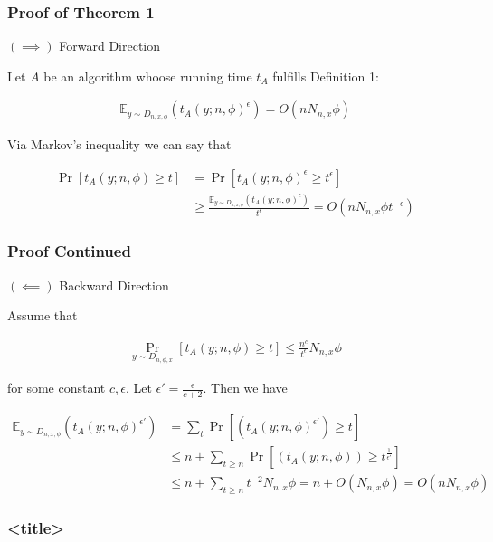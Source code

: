 \begin{frame}
    \frametitle{Proof of Theorem 1}

    $(\implies)$ Forward Direction

    Let $A$ be an algorithm whoose running time $t_A$ fulfills Definition 1:

    \begin{align*}
        \mathbb{E}_{y \sim D_{n, x, \phi}} \left(t_A(y; n, \phi) ^{\epsilon}\right) = O(nN_{n,x}\phi)
    \end{align*}

    Via Markov's inequality we can say that

    \begin{align*}
        \Pr[t_A(y; n, \phi) \geq t] &= \Pr[t_A(y; n, \phi)^\epsilon \geq t^\epsilon]\\
        &\geq \frac{\mathbb{E}_{y \sim D_{n, x, \phi}}(t_A(y; n, \phi)^\epsilon)}{t^\epsilon} = O(nN_{n,x}\phi t^{-\epsilon})
    \end{align*}

\end{frame}

\begin{frame}
    \frametitle{Proof Continued}

    $(\impliedby)$ Backward Direction

    Assume that

    \begin{align*}
        \Pr_{y \sim D_{n, \phi, x}}[t_A(y;n, \phi) \geq t] \leq \frac{n^c}{t^{\epsilon}} N_{n,x} \phi
    \end{align*}

    for some constant $c, \epsilon$. Let $\epsilon' = \frac{\epsilon}{c + 2}$. Then we have

    
    \begin{align*}
        \mathbb{E}_{y \sim D_{n, x, \phi}}\left(t_A(y; n, \phi) ^{\epsilon'}\right) &= \displaystyle\sum_{t} \Pr\left[\left(t_A(y; n, \phi) ^{\epsilon'}\right) \geq t\right]\\
        &\leq n + \displaystyle\sum_{t \geq n} \Pr\left[\left(t_A(y; n, \phi)\right) \geq t^{\frac{1}{\epsilon'}}\right]\\
        &\leq n + \displaystyle\sum_{t \geq n} t^{-2}N_{n, x} \phi = n + O(N_{n, x} \phi) = O(nN_{n, x} \phi)
    \end{align*}

\end{frame}


\begin{frame}
    \frametitle{<title>}

    

\end{frame}